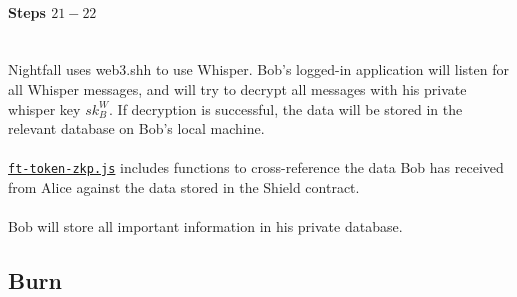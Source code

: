 \documentclass{article}
\begin{document}
\paragraph{Steps $21 - 22$}
\ \\
Nightfall uses web3.shh to use Whisper. Bob's logged-in application will listen for all Whisper messages, and will try to decrypt all messages with his private whisper key $sk^W_B$. If decryption is successful, the data will be stored in the relevant database on Bob's local machine.\\
\\
\hyperref[sec:f-token-zkp]{\texttt{ft-token-zkp.js}} includes functions to cross-reference the data Bob has received from Alice against the data stored in the Shield contract.\\
\ \\
Bob will store all important information in his private database.



























\newpage

\subsection{Burn}
\label{sec:20Burn}
\end{document}
